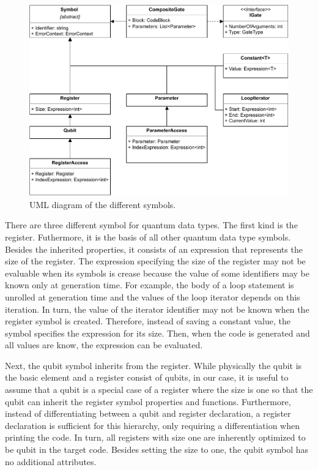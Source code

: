 \begin{figure}[htp]
    \centering
    \includegraphics[width=.9\textwidth]{../figures/uml_symbols.pdf}
    \caption{UML diagram of the different symbols.}
    \label{fig:implementation_uml_symbols}
\end{figure}

There are three different symbol for quantum data types. The first kind is the register. Futhermore, it is the basis of all other quantum data type symbols. Besides the inherited properties, it consists of an expression that represents the size of the register. The expression specifying the size of the register may not be evaluable when its symbols is crease because the value of some identifiers may be known only at generation time.
For example, the body of a loop statement is unrolled at generation time and the values of the loop iterator depends on this iteration. In turn, the value of the iterator identifier may not be known when the register symbol is created. Therefore, instead of saving a constant value, the symbol specifies the expression for its size. Then, when the code is generated and all values are know, the expression can be evaluated.    

Next, the qubit symbol inherits from the register. While physically the qubit is the basic element and a register consist of qubits, in our case, it is useful to assume that a qubit is a special case of a register where the size is one so that the qubit can inherit the register symbol properties and functions. Furthermore, instead of differentiating between a qubit and register declaration, a register declaration is sufficient for this hierarchy, only requiring a differentiation when printing the code. In turn, all registers with size one are inherently optimized to be qubit in the target code. Besides setting the size to one, the qubit symbol has no additional attributes.

